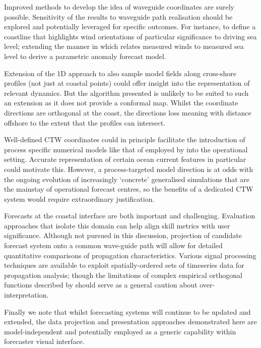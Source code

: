 Improved methods to develop the idea of waveguide coordinates are surely possible.
Sensitivity of the results to waveguide path realisation should be explored and potentially leveraged for specific outcomes.
For instance, to define a coastline that highlights wind orientations of particular significance to driving sea level; extending the manner in which \citet{Tilburg:2004cg} relates measured winds to measured sea level to derive a parametric anomaly forecast model. 


Extension of the 1D approach to also sample model fields along cross-shore profiles (not just at coastal points) could offer insight into the representation of relevant dynamics.
But the algorithm presented is unlikely to be suited to such an extension as it does not provide a conformal map.  Whilst the coordinate directions are orthogonal at the coast, the directions loss meaning with distance offshore to the extent that the profiles can intersect.
  


Well-defined CTW coordinates could in principle facilitate the introduction of process specific numerical models like that of \citet{Brink:1987va} employed by \citet{Liao:2018jd} into the operational setting.
Accurate representation of certain ocean current features in particular could motivate this. 
However, a process-targeted model direction is at odds with the ongoing evolution of increasingly `concrete' generalised simulations \citep{Petersen:2012tr} that are the mainstay of operational forecast centres, so the benefits of a dedicated CTW system would require extraordinary justification.

Forecasts at the coastal interface are both important and challenging. Evaluation approaches that isolate this domain can help align skill metrics with user significance.  
Although not pursued in this discussion, projection of candidate forecast system onto a common wave-guide path will allow for detailed quantitative comparisons of propagation characteristics.  Various signal processing techniques are available to exploit spatially-ordered sets of timeseries data for propagation analysis; though the limitations of complex empirical orthogonal functions described by \citet{Merrifield:1990um} should serve as a general caution about over-interpretation.   




Finally we note that whilst forecasting systems will continue to be updated and extended, the data projection and presentation approaches demonstrated here are model-independent and potentially employed as a generic capability within forecaster visual interface.




